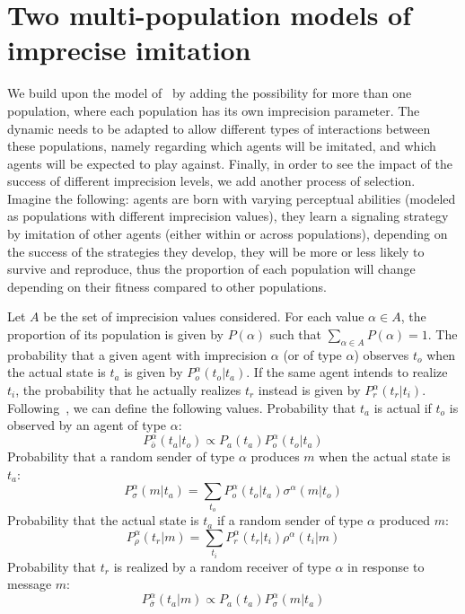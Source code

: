 \documentclass[a4paper]{article}
\begin{document}


\section{Two multi-population models of imprecise imitation}
\label{sec:multi-population-model}

We build upon the model of~\textcite{franke_vagueness_2017} by adding the possibility for more than one population, where each population has its own imprecision parameter.
The dynamic needs to be adapted to allow different types of interactions between these populations, namely regarding which agents will be imitated, and which agents will be expected to play against.
Finally, in order to see the impact of the success of different imprecision levels, we add another process of selection.
Imagine the following: agents are born with varying perceptual abilities (modeled as populations with different imprecision values), they learn a signaling strategy by imitation of other agents (either within or across populations), depending on the success of the strategies they develop, they will be more or less likely to survive and reproduce, thus the proportion of each population will change depending on their fitness compared to other populations.

Let $A$ be the set of imprecision values considered.
For each value $\alpha \in A$, the proportion of its population is given by $P(\alpha)$ such that $\sum_{\alpha \in A} P(\alpha) = 1$.
The probability that a given agent with imprecision $\alpha$ (or of type $\alpha$) observes $t_o$ when the actual state is $t_a$ is given by $P_{o}^{\alpha}(t_{o}|t_{a})$.
If the same agent intends to realize $t_i$, the probability that he actually realizes $t_r$ instead is given by $P_{r}^{\alpha}(t_{r}|t_{i})$.
Following~\textcite[26]{franke_vagueness_2017}, we can define the following values.
Probability that $t_a$ is actual if $t_o$ is observed by an agent of type $\alpha$:
$$
P_{\bar{o}}^{\alpha}(t_{a}|t_{o})\propto P_{a}(t_{a})P_{o}^{\alpha}(t_{o}|t_{a})
$$
Probability that a random sender of type $\alpha$ produces $m$ when the actual state is $t_a$:
$$
P_{\sigma}^{\alpha}(m|t_{a})=\sum_{t_{o}}P_{o}^{\alpha}(t_{o}|t_{a})\sigma^{\alpha}(m|t_{o})
$$
Probability that the actual state is $t_a$ if a random sender of type $\alpha$ produced $m$:
$$
P_{\rho}^{\alpha}(t_{r}|m)=\sum_{t_{i}}P_{r}^{\alpha}(t_{r}|t_{i})\rho^{\alpha}(t_{i}|m)
$$
Probability that $t_r$ is realized by a random receiver of type $\alpha$ in response to message $m$:
$$
P_{\bar{\sigma}}^{\alpha}(t_{a}|m)\propto P_{a}(t_{a})P_{\sigma}^{\alpha}(m|t_{a})
$$
\end{document}
